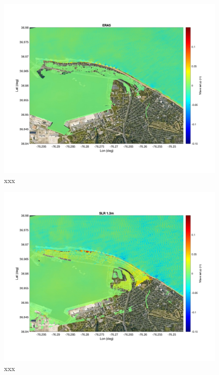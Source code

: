 \documentclass[preprint,12pt,authoryear]{elsarticle}
\begin{document}
\begin{figure}
\centering
\includegraphics[width=\textwidth]{./figures/funwave_ERA5_setup.jpg}
\caption{xxx }
\label{boundary}
\centering
\end{figure}

\begin{figure}
\centering
\includegraphics[width=\textwidth]{./figures/funwave_SLR_setup.jpg}
\caption{xxx }
\label{boundary}
\centering
\end{figure}
\end{document}
